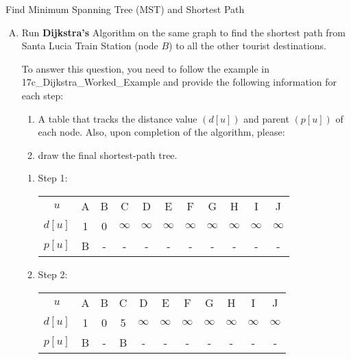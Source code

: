 \documentclass{article}
\numberwithin{table}{section}
\numberwithin{figure}{section}
\begin{document}
\begin{section}{Find Minimum Spanning Tree (MST) and Shortest Path}
\begin{enumerate}[(A)]
\begin{enumerate}[(a)]
\begin{tcolorbox}[breakable]
        \end{tcolorbox}
    \end{enumerate}
    
    \item Run \textbf{Dijkstra’s} Algorithm on the same graph to find the shortest path from Santa Lucia Train Station (node $B$) to all the other tourist destinations.
    
    To answer this question, you need to follow the example in 17c\_Dijkstra\_Worked\_Example and provide the following information for each step:
    \begin{enumerate}[(1)]
        \item A table that tracks the distance value $(d[u])$ and parent $(p[u])$ of each node.
        Also, upon completion of the algorithm, please:
        \item draw the final shortest-path tree.
    \end{enumerate}
    \begin{tcolorbox}[breakable]
    \begin{enumerate}[(1)]
                \item Step 1:
                \begin{table}[H]
                    \centering
                    \begin{tabular}{c|cccccccccc}
                        \hline
                        $u$ & A & B & C & D & E & F & G & H & I & J \\
                        $d[u]$ & 1 & 0 & $\infty$ & $\infty$ & $\infty$ & $\infty$ & $\infty$ & $\infty$ & $\infty$ & $\infty$ \\
                        $p[u]$ & B & - & - & - & - & - & - & - & - & - \\
                        \hline
                    \end{tabular}
                \end{table}
                

                \item Step 2:
                \begin{table}[H]
                    \centering
                    \begin{tabular}{c|cccccccccc}
                        \hline
                        $u$ & A & B & C & D & E & F & G & H & I & J \\
                        $d[u]$ & 1 & 0 & 5 & $\infty$ & $\infty$ & $\infty$ & $\infty$ & $\infty$ & $\infty$ & $\infty$ \\
                        $p[u]$ & B & - & B & - & - & - & - & - & - & - \\
                        \hline
                    \end{tabular}
                \end{table}
                


\end{enumerate}
\end{tcolorbox}
\end{enumerate}
\end{section}
\end{document}

